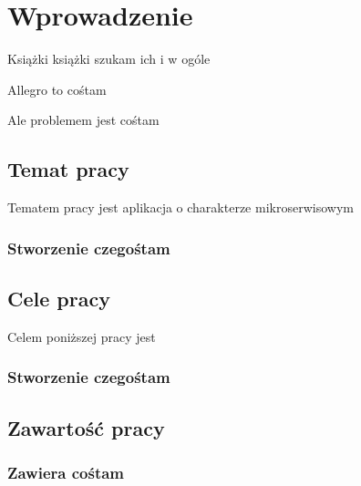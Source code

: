 \chapter{Wprowadzenie}
\label{cha:wprowadzenie}

Książki książki szukam ich i w ogóle

Allegro to cośtam

Ale problemem jest cośtam


\section{Temat pracy}
\label{sec:tematPracy}

Tematem pracy jest aplikacja o charakterze mikroserwisowym

\subsection{Stworzenie czegośtam}




\section{Cele pracy}
\label{sec:celePracy}


Celem poniższej pracy jest 

\subsection{Stworzenie czegośtam}




\section{Zawartość pracy}
\label{sec:zawartoscPracy}

\subsection{Zawiera cośtam}


















